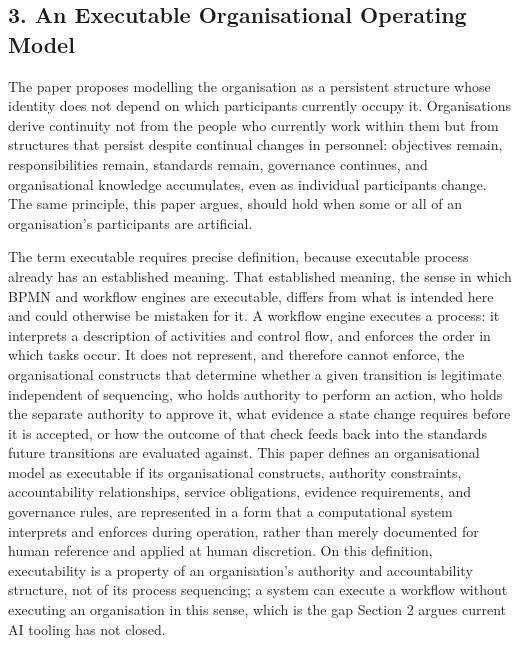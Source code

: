 \documentclass[
  11pt,
]{article}
\begin{document}
\hypertarget{an-executable-organisational-operating-model}{%
\subsection{3. An Executable Organisational Operating
Model}\label{an-executable-organisational-operating-model}}

The paper proposes modelling the organisation as a persistent structure
whose identity does not depend on which participants currently occupy
it. Organisations derive continuity not from the people who currently
work within them but from structures that persist despite continual
changes in personnel: objectives remain, responsibilities remain,
standards remain, governance continues, and organisational knowledge
accumulates, even as individual participants change. The same principle,
this paper argues, should hold when some or all of an organisation's
participants are artificial.

The term executable requires precise definition, because executable
process already has an established meaning. That established meaning,
the sense in which BPMN and workflow engines are executable, differs
from what is intended here and could otherwise be mistaken for it. A
workflow engine executes a process: it interprets a description of
activities and control flow, and enforces the order in which tasks
occur. It does not represent, and therefore cannot enforce, the
organisational constructs that determine whether a given transition is
legitimate independent of sequencing, who holds authority to perform an
action, who holds the separate authority to approve it, what evidence a
state change requires before it is accepted, or how the outcome of that
check feeds back into the standards future transitions are evaluated
against. This paper defines an organisational model as executable if its
organisational constructs, authority constraints, accountability
relationships, service obligations, evidence requirements, and
governance rules, are represented in a form that a computational system
interprets and enforces during operation, rather than merely documented
for human reference and applied at human discretion. On this definition,
executability is a property of an organisation's authority and
accountability structure, not of its process sequencing; a system can
execute a workflow without executing an organisation in this sense,
which is the gap Section 2 argues current AI tooling has not closed.
\end{document}
